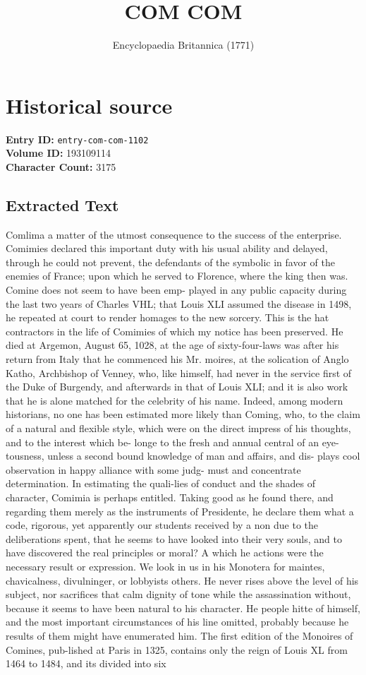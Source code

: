 \documentclass{article}
\title{COM COM}
\date{Encyclopaedia Britannica (1771)}
\begin{document}
\maketitle

\section*{Historical source}
\textbf{Entry ID:} \texttt{entry-com-com-1102} \\
\textbf{Volume ID:} 193109114 \\
\textbf{Character Count:} 3175

\subsection*{Extracted Text}
Comlima a matter of the utmost consequence to the success of the enterprise. Comimies declared this important duty with his usual ability and delayed, through he could not prevent, the defendants of the symbolic in favor of the enemies of France; upon which he served to Florence, where the king then was. Comine does not seem to have been emp- played in any public capacity during the last two years of Charles VHL; that Louis XLI assumed the disease in 1498, he repeated at court to render homages to the new sorcery. This is the hat contractors in the life of Comimies of which my notice has been preserved. He died at Argemon, August 65, 1028, at the age of sixty-four-laws was after his return from Italy that he commenced his Mr. moires, at the solication of Anglo Katho, Archbishop of Venney, who, like himself, had never in the service first of the Duke of Burgendy, and afterwards in that of Louis XLI; and it is also work that he is alone matched for the celebrity of his name. Indeed, among modern historians, no one has been estimated more likely than Coming, who, to the claim of a natural and flexible style, which were on the direct impress of his thoughts, and to the interest which be- longe to the fresh and annual central of an eye-tousness, unless a second bound knowledge of man and affairs, and dis- plays cool observation in happy alliance with some judg- must and concentrate determination. In estimating the quali-lies of conduct and the shades of character, Comimia is perhaps entitled. Taking good as he found there, and regarding them merely as the instruments of Presidente, he declare them what a code, rigorous, yet apparently our students received by a non due to the deliberations spent, that he seems to have looked into their very souls, and to have discovered the real principles or moral? A which he actions were the necessary result or expression. We look in us in his Monotera for maintes, chavicalness, divulninger, or lobbyists others. He never rises above the level of his subject, nor sacrifices that calm dignity of tone while the assassination without, because it seems to have been natural to his character. He people hitte of himself, and the most important circumstances of his line omitted, probably because he results of them might have enumerated him. The first edition of the Monoires of Comines, pub-lished at Paris in 1325, contains only the reign of Louis XL from 1464 to 1484, and its divided into six 
\end{document}
